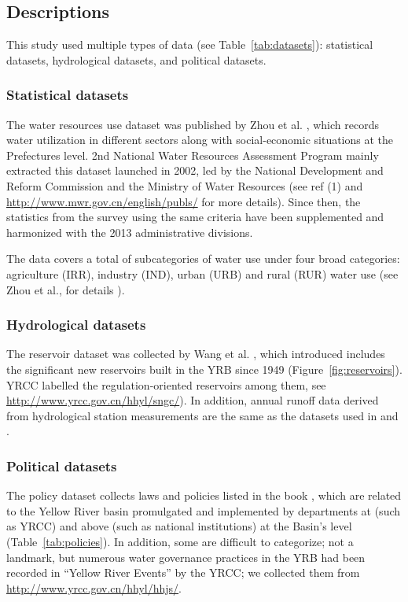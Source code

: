 \subsection*{Descriptions}
This study used multiple types of data (see Table~\ref{tab:datasets}): statistical datasets, hydrological datasets, and political datasets.

\subsubsection*{Statistical datasets}
The water resources use dataset was published by Zhou et al. \cite{zhou2020}, which records water utilization in different sectors along with social-economic situations at the Prefectures level. 2nd National Water Resources Assessment Program mainly extracted this dataset launched in 2002, led by the National Development and Reform Commission and the Ministry of Water Resources (see ref (1) and \url{http://www.mwr.gov.cn/english/publs/} for more details). Since then, the statistics from the survey using the same criteria have been supplemented and harmonized with the 2013 administrative divisions.

The data covers a total of subcategories of water use under four broad categories: agriculture (IRR), industry (IND), urban (URB) and rural (RUR) water use (see Zhou et al., for details \cite{zhou2020}).

\subsubsection*{Hydrological datasets}
The reservoir dataset was collected by Wang et al. \cite{wang2019c}, which introduced includes the significant new reservoirs built in the YRB since 1949 (Figure~\ref{fig:reservoirs}). YRCC labelled the regulation-oriented reservoirs among them, see \url{http://www.yrcc.gov.cn/hhyl/sngc/}). In addition, annual runoff data derived from hydrological station measurements are the same as the datasets used in \cite{wang2019c} and \cite{wang2016e}.

\subsubsection*{Political datasets}
The policy dataset collects laws and policies listed in the book \cite{yellowriverconservancycommission2013}, which are related to the Yellow River basin promulgated and implemented by departments at (such as YRCC) and above (such as national institutions) at the Basin's level (Table~\ref{tab:policies}).
In addition, some are difficult to categorize; not a landmark, but numerous water governance practices in the YRB had been recorded in ``Yellow River Events'' by the YRCC; we collected them from \url{http://www.yrcc.gov.cn/hhyl/hhjs/}.

